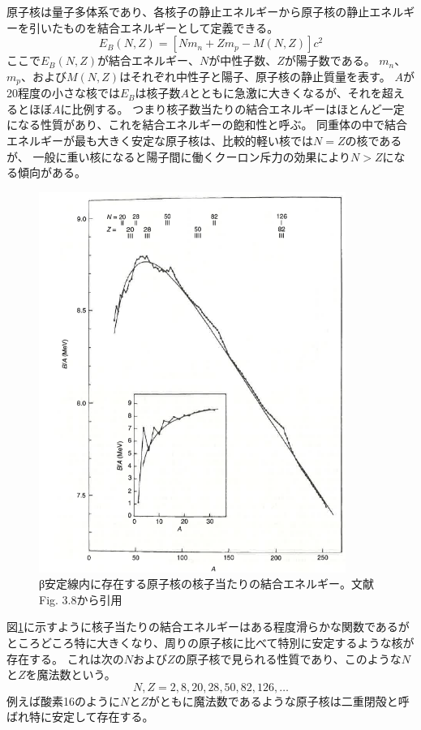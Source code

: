 \documentclass[12pt]{jarticle}
\begin{document}
原子核は量子多体系であり、各核子の静止エネルギーから原子核の静止エネルギーを引いたものを結合エネルギーとして定義できる。
\[
    E_B (N,Z) = [Nm_n + Zm_p - M(N,Z)]c^2
\]
ここで$E_B (N,Z)$が結合エネルギー、$N$が中性子数、$Z$が陽子数である。
$m_n$、$m_p$、および$M(N,Z)$はそれぞれ中性子と陽子、原子核の静止質量を表す。
$A$が20程度の小さな核では$E_B$は核子数$A$とともに急激に大きくなるが、それを超えるとほぼ$A$に比例する。
つまり核子数当たりの結合エネルギーはほとんど一定になる性質があり、これを結合エネルギーの飽和性と呼ぶ。
同重体の中で結合エネルギーが最も大きく安定な原子核は、比較的軽い核では$N=Z$の核であるが、
一般に重い核になると陽子間に働くクーロン斥力の効果により$N>Z$になる傾向がある。
\begin{figure}[H]
    \centering
    \includegraphics[width=100mm]{../bindingE.png}
    \caption{
        β安定線内に存在する原子核の核子当たりの結合エネルギー。文献\cite{NuclearStructure}Fig. 3.8から引用
    }\label{fig:bindingE}
\end{figure}
図\ref{fig:bindingE}に示すように核子当たりの結合エネルギーはある程度滑らかな関数であるがところどころ特に大きくなり、周りの原子核に比べて特別に安定するような核が存在する。
これは次の$N$および$Z$の原子核で見られる性質であり、このような$N$と$Z$を魔法数という。
\[
    N,Z = 2,8,20,28,50,82,126,…
\]
例えば酸素16のように$N$と$Z$がともに魔法数であるような原子核は二重閉殻と呼ばれ特に安定して存在する。
\end{document}
